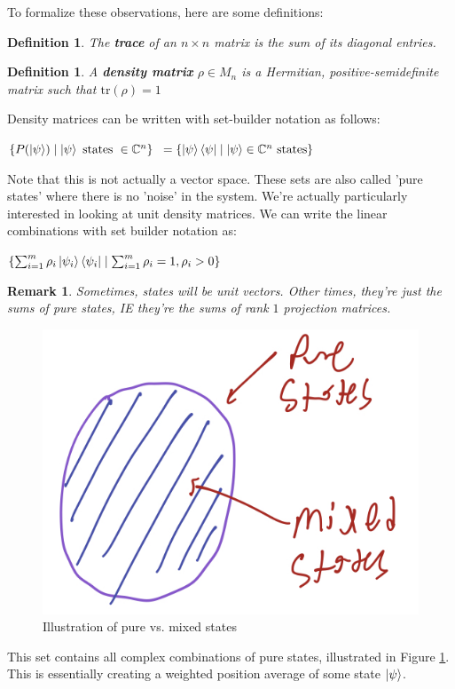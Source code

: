 \documentclass[12pt]{article}
\theoremstyle{plain}
\theoremstyle{nonumberplain}
\theoremstyle{plain}
\newtheorem{definition}[lemma]{Definition}
\newtheorem{remark}[lemma]{Remark}
\theoremstyle{nonumberplain}
\newcommand\1{{\bf 1}}
\newcommand{\C}{\mathbb{C}} %
\newcommand{\<}{\left\langle}
\renewcommand{\>}{\right\rangle}
\newcommand{\lb}{\left\{}
\newcommand{\rb}{\right\}}
\begin{document}
To formalize these observations, here are some definitions:
\begin{definition}
The \textbf{trace} of an $n\times n$ matrix is the \textit{sum} of its diagonal entries.
\end{definition}
\begin{definition}
A \textbf{density matrix} $\rho\in M_n$ is a Hermitian, positive-semidefinite matrix such that $\text{tr}(\rho)=1$
\end{definition}
Density matrices can be written with set-builder notation as follows:
\begin{center}
$\lb P(\ket{\psi}) \mid \ket{\psi} \text{ states }\in\C^n \rb$
$=\lb \ket{\psi}\bra{\psi} \mid \ket{\psi} \in\C^n \text{ states} \rb$
\end{center}
Note that this is not actually a vector space. These sets are also called 'pure states' where there is no 'noise' in the system. We're actually particularly interested in looking at unit density matrices. We can write the linear combinations with set builder notation as:
\begin{center}
$\lb \sum^{m}_{i=1} \rho_i \ket{\psi_i}\bra{\psi_i} \mid \sum^{m}_{i=1} \rho_i=1, \rho_i>0 \rb$
\end{center}
\begin{remark}
Sometimes, states will be unit vectors. Other times, they're just the sums of pure states, IE they're the sums of rank $1$ projection matrices.
\end{remark}
\begin{figure}[h]
  \includegraphics[width=.5\linewidth]{pure_mixed.jpeg}
  \centering
  \caption{Illustration of pure vs. mixed states}
  \label{fig:puremixed1}
\end{figure}
This set contains all complex combinations of pure states, illustrated in Figure \ref{fig:puremixed1}. This is essentially creating a weighted position average of some state $\ket{\psi}$.

\end{document}
